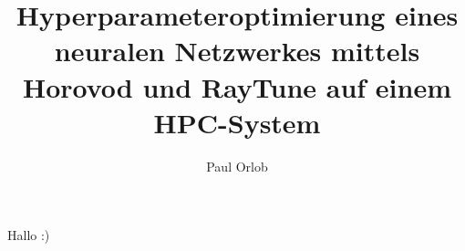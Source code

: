 \documentclass[bachinf,german,utf8]{zihpub}
\author{Paul Orlob}
\title{Hyperparameteroptimierung eines neuralen Netzwerkes mittels Horovod und RayTune auf einem HPC-System}
\begin{document}
Hallo :)
\end{document}

